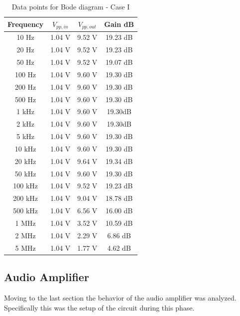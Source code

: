 \documentclass[../main.tex]{subfiles}
\begin{document}
\begin{table}[h!]
\centering	

\begin{tabular}{cccc}
\textbf{Frequency} & \textbf{$V_{pp,in}$} & \textbf{$V_{pp,out}$}  & \textbf{Gain dB} \\
\hline
 10 Hz & 1.04 V & 9.52 V & 19.23 dB \\
 \hline
 20 Hz & 1.04 V & 9.52 V &  19.23 dB \\
 \hline
 50 Hz & 1.04 V & 9.52 V & 19.07 dB \\
 \hline
 100 Hz & 1.04 V & 9.60 V & 19.30 dB \\
 \hline
 200 Hz & 1.04 V & 9.60 V & 19.30 dB \\
 \hline
 500 Hz & 1.04 V & 9.60 V & 19.30 dB \\
 \hline
 1 kHz & 1.04 V & 9.60 V &  19.30dB \\
 \hline
 2 kHz & 1.04 V & 9.60 V &  19.30dB \\
 \hline
 5 kHz & 1.04 V & 9.60 V & 19.30 dB \\
 \hline
 10 kHz & 1.04 V & 9.60 V & 19.30 dB \\
 \hline
 20 kHz & 1.04  V & 9.64 V & 19.34 dB \\
 \hline
 50 kHz & 1.04  V & 9.60 V & 19.30  dB \\
 \hline
 100 kHz & 1.04 V & 9.52 V & 19.23 dB \\
 \hline
 200 kHz &1.04  V & 9.04 V & 18.78 dB \\
 \hline
 500 kHz & 1.04 V & 6.56 V & 16.00 dB \\
 \hline
 1 MHz & 1.04 V & 3.52 V & 10.59 dB \\
  \hline
 2 MHz & 1.04 V & 2.29 V & 6.86 dB \\
  \hline
 5 MHz & 1.04 V & 1.77 V & 4.62 dB \\

\end{tabular}
\caption*{Data points for Bode diagram - Case I}
\end{table}




\subsection{Audio Amplifier}

Moving to the last section the behavior of the audio amplifier was analyzed.
Specifically this was the setup of the circuit during this phase.
\end{document}
